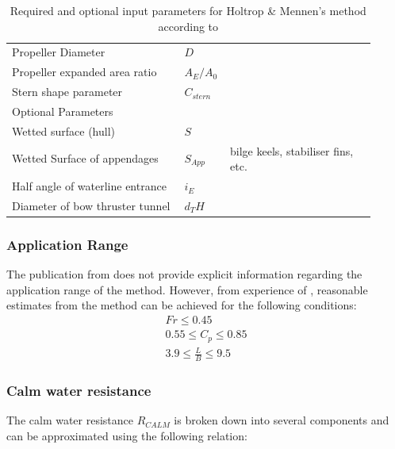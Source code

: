 \begin{table}[ht]
{\begin{tabular}{ p{0.45\linewidth} p{0.08\linewidth} p{0.38\linewidth}  }
    Propeller Diameter & $D$ \\
    Propeller expanded area ratio & $A_E/A_0$ \\
    Stern shape parameter & $C_{stern}$ \\
    \hline
    Optional Parameters&&\\
    \hline
    Wetted surface (hull) & $S$\\
    Wetted Surface of appendages & $S_{App}$ & bilge keels, stabiliser fins, etc.\\
    Half angle of waterline entrance & $i_E$ \\
    Diameter of bow thruster tunnel & $d_TH$ \\
    \hline
    \end{tabular}}
\caption{Required and optional input parameters for Holtrop \& Mennen's method according to }\label{tbl:holtrop_params}
\end{table}

\subsubsection*{Application Range}

The publication from  does not provide explicit information regarding the application range of the method. However, from experience of , reasonable estimates from the method can be achieved for the following conditions: \\

\begin{equation}
    \begin{gathered}
        Fr \leqslant 0.45 \\
        0.55 \leqslant C_p \leqslant 0.85 \\
        3.9 \leqslant \frac{L}{B} \leqslant 9.5
    \end{gathered}
\end{equation}

\subsubsection{Calm water resistance}\label{sec:Calm_Resistance}

The calm water resistance $R_{CALM}$ is broken down into several components and can be approximated using the following relation:

